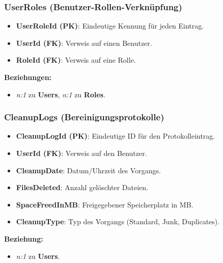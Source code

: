 \subsubsection*{UserRoles (Benutzer-Rollen-Verknüpfung)}
{\small
\begin{itemize}
    \item \textbf{UserRoleId (PK)}: Eindeutige Kennung für jeden Eintrag.
    \item \textbf{UserId (FK)}: Verweis auf einen Benutzer.
    \item \textbf{RoleId (FK)}: Verweis auf eine Rolle.
\end{itemize}
\textbf{Beziehungen:}
\begin{itemize}
    \item \textit{n:1} zu \textbf{Users}, \textit{n:1} zu \textbf{Roles}.
\end{itemize}
}

\subsubsection*{CleanupLogs (Bereinigungsprotokolle)}
{\small
\begin{itemize}
    \item \textbf{CleanupLogId (PK)}: Eindeutige ID für den Protokolleintrag.
    \item \textbf{UserId (FK)}: Verweis auf den Benutzer.
    \item \textbf{CleanupDate}: Datum/Uhrzeit des Vorgangs.
    \item \textbf{FilesDeleted}: Anzahl gelöschter Dateien.
    \item \textbf{SpaceFreedInMB}: Freigegebener Speicherplatz in MB.
    \item \textbf{CleanupType}: Typ des Vorgangs (Standard, Junk, Duplicates).
\end{itemize}
\textbf{Beziehung:}
\begin{itemize}
    \item \textit{n:1} zu \textbf{Users}.
\end{itemize}
}

